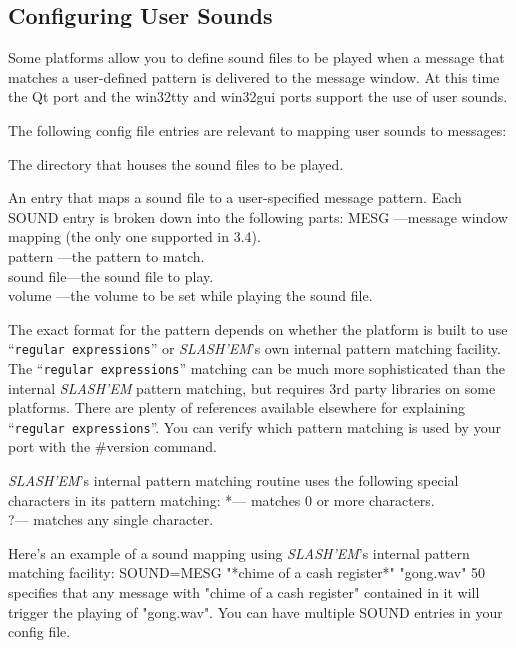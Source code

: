 \subsection*{Configuring User Sounds}


Some platforms allow you to define sound files to be played when a message 
that matches a user-defined pattern is delivered to the message window.
At this time the Qt port and the win32tty and win32gui ports support the
use of user sounds.

The following config file entries are relevant to mapping user sounds
to messages:
\blist{}

\item[\bb{SOUNDDIR}]
The directory that houses the sound files to be played.

\item[\bb{SOUND}]
An entry that maps a sound file to a user-specified message pattern.
Each SOUND entry is broken down into the following parts:
MESG      ---message window mapping (the only one supported in 3.4).\\
pattern   ---the pattern to match.\\
sound file---the sound file to play.\\
volume    ---the volume to be set while playing the sound file.
\elist
\nd %

The exact format for the pattern depends on whether the platform is
built to use ``{\tt regular expressions}'' or {\it SLASH'EM\/}'s own internal pattern 
matching facility. The ``{\tt regular expressions}'' matching can be much more 
sophisticated than the internal {\it SLASH'EM\/} pattern matching, but requires 
3rd party libraries on some platforms.  There are plenty of references 
available elsewhere for explaining ``{\tt regular expressions}''. You can verify 
which pattern matching is used by your port with the \#version command.  

{\it SLASH'EM\/}'s internal pattern matching routine uses the following
special characters in its pattern matching:
  *--- matches 0 or more characters.\\
  ?--- matches any single character.

Here's an example of a sound mapping using {\it SLASH'EM\/}'s internal
pattern matching facility:
    SOUND=MESG "*chime of a cash register*" "gong.wav" 50
specifies that any message with "chime of a cash register" contained
in it will trigger the playing of "gong.wav".  You can have multiple
SOUND entries in your config file.

